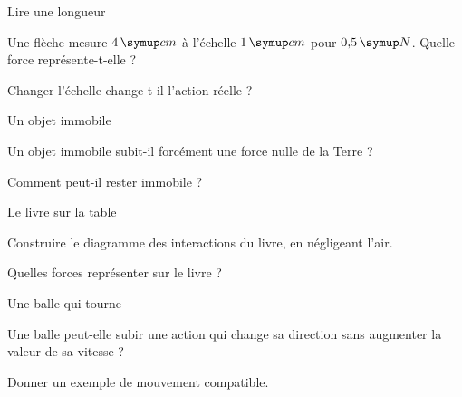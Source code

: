 \par\noindent\begin{minipage}{\linewidth}
\begin{exercice}[2]{Lire une longueur}
\begin{questions}
\item Une flèche mesure $4\unite{cm}$ à l’échelle $1\unite{cm}$ pour $0{,}5\unite N$. Quelle force représente-t-elle ?
\item Changer l’échelle change-t-il l’action réelle ?
\end{questions}
\end{exercice}
\end{minipage}
\par\noindent\begin{minipage}{\linewidth}
\begin{exercice}[2]{Un objet immobile}
\begin{questions}
\item Un objet immobile subit-il forcément une force nulle de la Terre ?
\item Comment peut-il rester immobile ?
\end{questions}
\end{exercice}
\end{minipage}
\par\noindent\begin{minipage}{\linewidth}
\begin{exercice}[2]{Le livre sur la table}
\begin{questions}
\item Construire le diagramme des interactions du livre, en négligeant l’air.
\item Quelles forces représenter sur le livre ?
\end{questions}
\end{exercice}
\end{minipage}
\par\noindent\begin{minipage}{\linewidth}
\begin{exercice}[2]{Une balle qui tourne}
\begin{questions}
\item Une balle peut-elle subir une action qui change sa direction sans augmenter la valeur de sa vitesse ?
\item Donner un exemple de mouvement compatible.
\end{questions}
\end{exercice}
\end{minipage}
